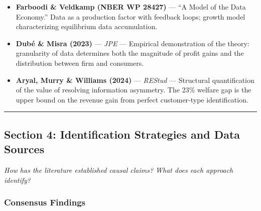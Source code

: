 \documentclass[
]{article}
\providecommand{\tightlist}{%
  \setlength{\itemsep}{0pt}\setlength{\parskip}{0pt}}
\begin{document}
\begin{itemize}
\tightlist
\item
  \textbf{Farboodi \& Veldkamp (NBER WP 28427)} --- ``A Model of the
  Data Economy.'' Data as a production factor with feedback loops;
  growth model characterizing equilibrium data accumulation.
\item
  \textbf{Dubé \& Misra (2023)} --- \emph{JPE} --- Empirical
  demonstration of the theory: granularity of data determines both the
  magnitude of profit gains and the distribution between firm and
  consumers.
\item
  \textbf{Aryal, Murry \& Williams (2024)} --- \emph{REStud} ---
  Structural quantification of the value of resolving information
  asymmetry. The 23\% welfare gap is the upper bound on the revenue gain
  from perfect customer-type identification.
\end{itemize}

\begin{center}\rule{0.5\linewidth}{0.5pt}\end{center}

\hypertarget{section-4-identification-strategies-and-data-sources}{%
\subsection{Section 4: Identification Strategies and Data
Sources}\label{section-4-identification-strategies-and-data-sources}}

\emph{How has the literature established causal claims? What does each
approach identify?}

\hypertarget{consensus-findings-2}{%
\subsubsection{Consensus Findings}\label{consensus-findings-2}}
\end{document}
